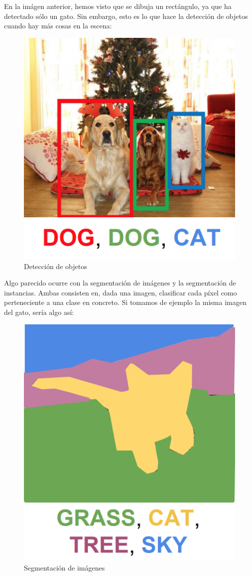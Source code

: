 \documentclass[11pt,a4paper]{article}
\begin{document}
En la imágen anterior, hemos visto que se dibuja un rectángulo, ya que ha detectado sólo un gato. Sin embargo, esto es lo que hace la detección de objetos cuando
hay más cosas en la escena:
\begin{figure}[H]
\centering
\includegraphics[scale=0.5]{img/object_detection.png}
\caption{Detección de objetos}
\end{figure}

Algo parecido ocurre con la segmentación de imágenes y la segmentación de instancias. Ambas consisten en, dada una imagen, clasificar cada píxel como perteneciente
a una clase en concreto. Si tomamos de ejemplo la misma imagen del gato, sería algo así:
\begin{figure}[H]
\centering
\includegraphics[scale=0.5]{img/semantic_segmentation.png}
\caption{Segmentación de imágenes}
\end{figure}
\end{document}
